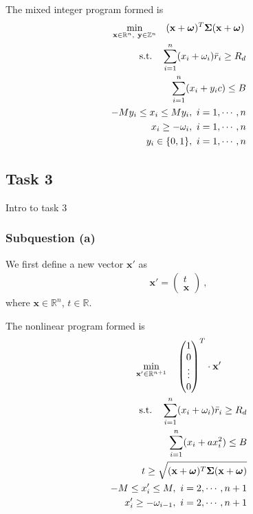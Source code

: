\documentclass[12pt]{ftec2101}
\newcommand{\vect}[1]{\mathbf{#1}}
\begin{document}
The mixed integer program formed is
\begin{gather}
    \min_{\vect{x}\in\mathbb{R}^n ,\  \vect{y}\in \mathbb{Z}^n} \quad (\vect{x}+\boldsymbol{\omega})^T \boldsymbol{\Sigma} (\vect{x}+\boldsymbol{\omega}) \\
    \label{mix:integer}
    \begin{aligned}
    \textup{s.t.} \quad \sum_{i=1}^{n} (x_i+\omega_i)\bar{r}_i \geq R_d\\
                \sum_{i=1}^{n} (x_i+y_i c) \leq B\\
                -M y_i \leq x_i \leq M y_i,\ i=1,\cdots,n\\
                x_i \geq -\omega_i,\ i = 1,\cdots,n\\
                y_i \in \{0,1\},\ i = 1,\cdots,n
\end{aligned}
\end{gather}
\subsection{Task 3}
Intro to task 3
\subsubsection{Subquestion (a)}
We first define a new vector $\vect{x'}$ as
\begin{align*}
    \vect{x'} = 
    \begin{pmatrix}
        t \\
        \vect{x}
    \end{pmatrix}\ , 
\end{align*}
where $\vect{x} \in \mathbb{R}^n$, $t \in \mathbb{R}$.

\noindent
The nonlinear program formed is 
\begin{gather}
    \min_{\vect{x'} \in \mathbb{R}^{n+1}} \quad
    \begin{pmatrix}
        1 \\
        0 \\
        \vdots \\
        0
    \end{pmatrix}^T
    \cdot \vect{x'}\\
\begin{aligned}
    \textup{s.t.} \quad \sum_{i=1}^{n} (x_i + \omega_i)\bar{r}_i \geq R_d \\
                        \sum_{i=1}^{n} (x_i + a x_i^2) \leq B \\
                        t \geq \sqrt{(\vect{x}+\boldsymbol{\omega})^T \boldsymbol{\Sigma} (\vect{x}+\boldsymbol{\omega})} \\
                        -M \leq x'_i \leq M,\ i=2,\cdots,n+1 \\
                        x'_i \geq - \omega_{i - 1},\ i=2,\cdots,n+1
\end{aligned}
\label{nonlinear:constraint}
\end{gather}
\end{document}
